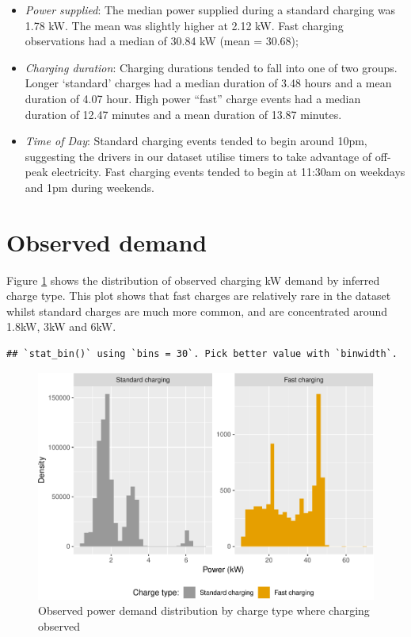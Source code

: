 \documentclass[]{article}
\providecommand{\tightlist}{%
  \setlength{\itemsep}{0pt}\setlength{\parskip}{0pt}}
\begin{document}
\begin{itemize}
\tightlist
\item
  \emph{Power supplied}: The median power supplied during a standard
  charging was 1.78 kW. The mean was slightly higher at 2.12 kW. Fast
  charging observations had a median of 30.84 kW (mean = 30.68);
\item
  \emph{Charging duration}: Charging durations tended to fall into one
  of two groups. Longer `standard' charges had a median duration of 3.48
  hours and a mean duration of 4.07 hour. High power ``fast'' charge
  events had a median duration of 12.47 minutes and a mean duration of
  13.87 minutes.
\item
  \emph{Time of Day}: Standard charging events tended to begin around
  10pm, suggesting the drivers in our dataset utilise timers to take
  advantage of off-peak electricity. Fast charging events tended to
  begin at 11:30am on weekdays and 1pm during weekends.
\end{itemize}

\section{Observed demand}\label{observed-demand}

Figure \ref{fig:obsPower} shows the distribution of observed charging kW
demand by inferred charge type. This plot shows that fast charges are
relatively rare in the dataset whilst standard charges are much more
common, and are concentrated around 1.8kW, 3kW and 6kW.

\begin{verbatim}
## `stat_bin()` using `bins = 30`. Pick better value with `binwidth`.
\end{verbatim}

\begin{figure}
\centering
\includegraphics{EVBB_report_files/figure-latex/obsPower-1.pdf}
\caption{\label{fig:obsPower}Observed power demand distribution by charge
type where charging observed}
\end{figure}
\end{document}
